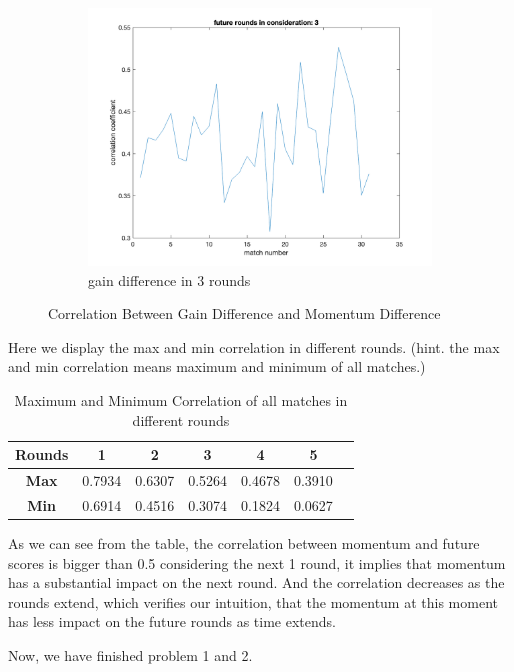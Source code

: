 \begin{figure}[H]
    \begin{subfigure}[b]{0.34\textwidth}
        \includegraphics[width=\linewidth]{mainmatter/imgs/momen_3points_cor.png}
        \caption{gain difference in 3 rounds}
    \end{subfigure}
    \caption{Correlation Between Gain Difference and Momentum Difference}
    \label{fig:Correlation}
\end{figure}

Here we display the max and min correlation in different rounds.
(hint. the max and min correlation means maximum and minimum of all matches.)

\begin{table}[H]
    \centering
    \begin{tabular}{ccccccc}
        \toprule
        \textbf{Rounds} & \textbf{1} & \textbf{2} & \textbf{3} & \textbf{4} & \textbf{5} \\
        \midrule
        \textbf{Max} & 0.7934 & 0.6307 & 0.5264 & 0.4678 & 0.3910 \\
        \textbf{Min} & 0.6914 & 0.4516 & 0.3074 & 0.1824 & 0.0627 \\
        \bottomrule
    \end{tabular}
    \caption{Maximum and Minimum Correlation of all matches in different rounds}
    \label{fig:maxmin_correlation}
\end{table}

As we can see from the table, the correlation between momentum and future scores is bigger
than 0.5 considering the next 1 round, it implies that momentum has a substantial impact on the next round.
And the correlation decreases as the rounds extend, which verifies our intuition, that
the momentum at this moment has less impact on the future rounds as time extends.

Now, we have finished problem 1 and 2.